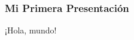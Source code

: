 \documentclass{beamer}
\begin{document}
	\begin{frame}
		\frametitle{Mi Primera Presentación}
		¡Hola, mundo!
	\end{frame}
\end{document}

